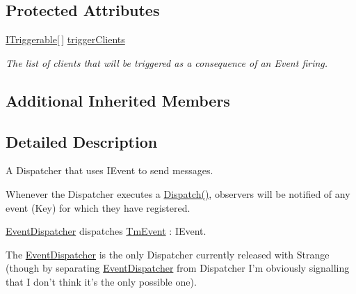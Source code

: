 \subsection*{Protected Attributes}
\begin{DoxyCompactItemize}
\item 
\hypertarget{classstrange_1_1extensions_1_1dispatcher_1_1eventdispatcher_1_1impl_1_1_event_dispatcher_a04a125caaca5a1e6b2f81924df9480f1}{\hyperlink{interfacestrange_1_1extensions_1_1dispatcher_1_1api_1_1_i_triggerable}{I\-Triggerable}\mbox{[}$\,$\mbox{]} \hyperlink{classstrange_1_1extensions_1_1dispatcher_1_1eventdispatcher_1_1impl_1_1_event_dispatcher_a04a125caaca5a1e6b2f81924df9480f1}{trigger\-Clients}}\label{classstrange_1_1extensions_1_1dispatcher_1_1eventdispatcher_1_1impl_1_1_event_dispatcher_a04a125caaca5a1e6b2f81924df9480f1}

\begin{DoxyCompactList}\small\item\em The list of clients that will be triggered as a consequence of an Event firing. \end{DoxyCompactList}\end{DoxyCompactItemize}
\subsection*{Additional Inherited Members}


\subsection{Detailed Description}
A Dispatcher that uses I\-Event to send messages. 

Whenever the Dispatcher executes a {\ttfamily \hyperlink{classstrange_1_1extensions_1_1dispatcher_1_1eventdispatcher_1_1impl_1_1_event_dispatcher_a70d8d7740798e10f960c866e03c4639b}{Dispatch()}}, observers will be notified of any event (Key) for which they have registered.

\hyperlink{classstrange_1_1extensions_1_1dispatcher_1_1eventdispatcher_1_1impl_1_1_event_dispatcher}{Event\-Dispatcher} dispatches \hyperlink{classstrange_1_1extensions_1_1dispatcher_1_1eventdispatcher_1_1impl_1_1_tm_event}{Tm\-Event} \-: I\-Event.

The \hyperlink{classstrange_1_1extensions_1_1dispatcher_1_1eventdispatcher_1_1impl_1_1_event_dispatcher}{Event\-Dispatcher} is the only Dispatcher currently released with Strange (though by separating \hyperlink{classstrange_1_1extensions_1_1dispatcher_1_1eventdispatcher_1_1impl_1_1_event_dispatcher}{Event\-Dispatcher} from Dispatcher I'm obviously signalling that I don't think it's the only possible one).

